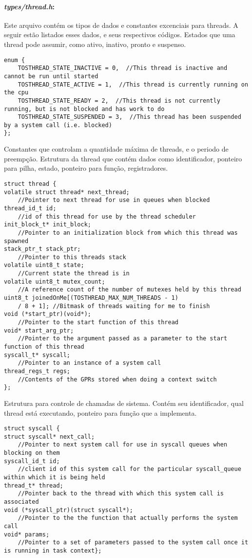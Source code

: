 \documentclass[a4paper,onecolumn, 10pt]{article}
\begin{document}
\paragraph{\textit{types/thread.h}:} 
Este arquivo contém os tipos de dados e constantes excenciais para threads. A seguir estão listados esses dados, e seus
respectivos códigos.
Estados que uma thread pode assumir, como ativo, inativo, pronto e suspenso.
\begin{lstlisting}
enum {
    TOSTHREAD_STATE_INACTIVE = 0,  //This thread is inactive and cannot be run until started
    TOSTHREAD_STATE_ACTIVE = 1,  //This thread is currently running on the cpu
    TOSTHREAD_STATE_READY = 2,  //This thread is not currently running, but is not blocked and has work to do 
    TOSTHREAD_STATE_SUSPENDED = 3,  //This thread has been suspended by a system call (i.e. blocked)
};
\end{lstlisting}
Constantes que controlam a quantidade máxima de threads, e o periodo de preempção.
\label{thread_t}Estrutura da thread que contém dados como identificador, ponteiro para pilha, estado, ponteiro para função,
registradores.
\begin{lstlisting}
struct thread {
volatile struct thread* next_thread;  
    //Pointer to next thread for use in queues when blocked
thread_id_t id;                       
    //id of this thread for use by the thread scheduler
init_block_t* init_block;             
    //Pointer to an initialization block from which this thread was spawned
stack_ptr_t stack_ptr;                
    //Pointer to this threads stack
volatile uint8_t state;               
    //Current state the thread is in
volatile uint8_t mutex_count;         
    //A reference count of the number of mutexes held by this thread
uint8_t joinedOnMe[(TOSTHREAD_MAX_NUM_THREADS - 1) 
    / 8 + 1]; //Bitmask of threads waiting for me to finish
void (*start_ptr)(void*);             
    //Pointer to the start function of this thread
void* start_arg_ptr;                  
    //Pointer to the argument passed as a parameter to the start function of this thread
syscall_t* syscall;                   
    //Pointer to an instance of a system call
thread_regs_t regs;                   
    //Contents of the GPRs stored when doing a context switch
};
\end{lstlisting}
Estrutura para controle de chamadas de sistema. Contém seu identificador, qual thread está executando, 
ponteiro para função que a implementa.
\begin{lstlisting}
struct syscall {
struct syscall* next_call;        
    //Pointer to next system call for use in syscall queues when blocking on them
syscall_id_t id;                  
    //client id of this system call for the particular syscall_queue within which it is being held
thread_t* thread;                 
    //Pointer back to the thread with which this system call is associated
void (*syscall_ptr)(struct syscall*);   
    //Pointer to the the function that actually performs the system call
void* params;                     
    //Pointer to a set of parameters passed to the system call once it is running in task context};
\end{lstlisting}
\end{document}
